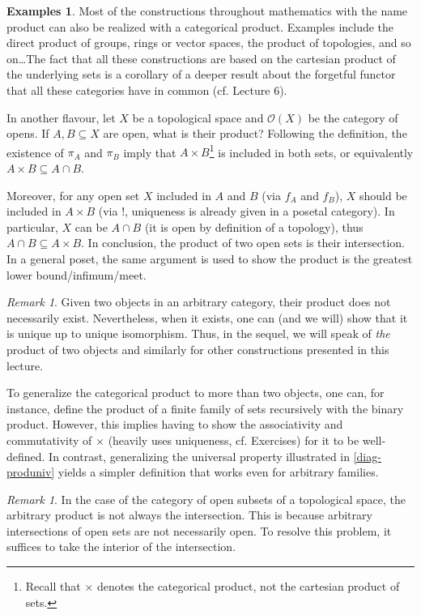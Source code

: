 \documentclass{article}
\theoremstyle{definition}
\newtheorem{exmps}[thm]{Examples}
\theoremstyle{remark}
\newtheorem{rem}[thm]{Remark}
\begin{document}
\begin{exmps}
    Most of the constructions throughout mathematics with the name product can also be realized with a categorical product. Examples include the direct product of groups, rings or vector spaces, the product of topologies, and so on\dots The fact that all these constructions are based on the cartesian product of the underlying sets is a corollary of a deeper result about the forgetful functor that all these categories have in common (cf. Lecture 6).

    In another flavour, let $X$ be a topological space and $\mathcal{O}(X)$ be the category of opens. If $A, B \subseteq X$ are open, what is their product? Following the definition, the existence of $\pi_A$ and $\pi_B$ imply that $A\times B$\footnote{Recall that $\times$ denotes the categorical product, not the cartesian product of sets.} is included in both sets, or equivalently $A \times B \subseteq A \cap B$.
    
    Moreover, for any open set $X$ included in $A$ and $B$ (via $f_A$ and $f_B$), $X$ should be included in $A \times B$ (via $!$, uniqueness is already given in a posetal category). In particular, $X$ can be $A \cap B$ (it is open by definition of a topology), thus $A \cap B \subseteq A \times B$. In conclusion, the product of two open sets is their intersection. In a general poset, the same argument is used to show the product is the greatest lower bound/infimum/meet.
\end{exmps}
\begin{rem}
    Given two objects in an arbitrary category, their product does not necessarily exist. Nevertheless, when it exists, one can (and we will) show that it is unique up to unique isomorphism. Thus, in the sequel, we will speak of \textit{the} product of two objects and similarly for other constructions presented in this lecture.
\end{rem}
To generalize the categorical product to more than two objects, one can, for instance, define the product of a finite family of sets recursively with the binary product. However, this implies having to show the associativity and commutativity of $\times$ (heavily uses uniqueness, cf. Exercises) for it to be well-defined. In contrast, generalizing the universal property illustrated in \eqref{diag-produniv} yields a simpler definition that works even for arbitrary families.
\begin{rem}
    In the case of the category of open subsets of a topological space, the arbitrary product is not always the intersection. This is because arbitrary intersections of open sets are not necessarily open. To resolve this problem, it suffices to take the interior of the intersection.
\end{rem}
\end{document}
